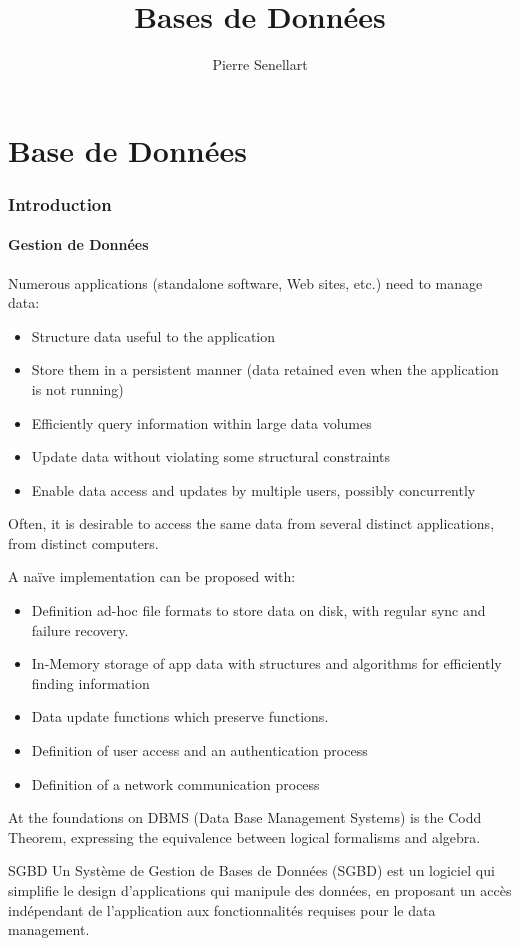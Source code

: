 \documentclass{cours}
\title{Bases de Données}
\author{Pierre Senellart}
\begin{document}
\part{Base de Données}
\section{Introduction}
\subsection{Gestion de Données}
Numerous applications (standalone software, Web sites, etc.) need to manage data:
\begin{itemize}
    \item Structure data useful to the application
    \item Store them in a persistent manner (data retained even when the application is not running)
    \item Efficiently query information within large data volumes
    \item Update data without violating some structural constraints
    \item Enable data access and updates by multiple users, possibly concurrently
\end{itemize}
Often, it is desirable to access the same data from several distinct applications, from distinct computers.

A naïve implementation can be proposed with:
\begin{itemize}
    \item Definition ad-hoc file formats to store data on disk, with regular sync and failure recovery.
    \item In-Memory storage of app data with structures and algorithms for efficiently finding information
    \item Data update functions which preserve functions. 
    \item Definition of user access and an authentication process
    \item Definition of a network communication process
\end{itemize}
At the foundations on DBMS (Data Base Management Systems) is the Codd Theorem, expressing the equivalence between logical formalisms and algebra.\\

\begin{définition}{SGBD}{}
    Un Système de Gestion de Bases de Données (SGBD) est un logiciel qui simplifie le design d'applications qui manipule des données, en proposant un accès indépendant de l'application aux fonctionnalités requises pour le data management. 
\end{définition}
\end{document}
